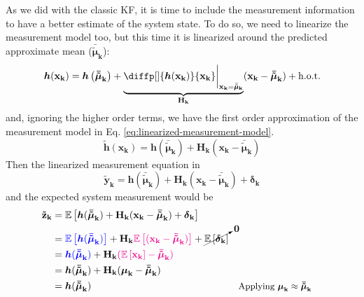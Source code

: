 \documentclass[12pt]{article}
\newcommand{\bvec}[1]{\mathbf{#1}} %
\newcommand{\mat}[1]{\mathbf{#1}}
\newcommand{\brac}[1]{\left[#1\right]} %
\newcommand{\parentheses}[1]{\left(#1\right)}
\newcommand{\mb}[1]{{\boldsymbol{#1}}} %
\newcommand{\expv}[1]{\mathbb{E}\brac{#1}} %
\newcommand{\hot}{\text{h.o.t.}}
\newcommand{\blue}[1]{\color{blue}#1\color{black}}
\newcommand{\magenta}[1]{\color{magenta}#1\color{black}}
\begin{document}
As we did with the classic KF, it is time to include the measurement information to have a better estimate of the system state. To do so, we need to linearize the measurement model too, but this time it is linearized around the predicted approximate mean ($\mb{\bar{\tilde{\mu}}}_\mathbf{k}$):
\begin{equation*}
    \mb{h}(\bvec{x_k}) = \mb{h}\parentheses{\mb{\bar{\tilde{\mu}}}_\mathbf{k}} + \underbrace{\diffp[]{\mb{h}(\bvec{x_k})}{\bvec{x_{k}}} \bigg\lvert_{\bvec{x_k}=\bar{\mb{\tilde{\mu}}}_\mathbf{k}}}_{\mat{H_k}} (\bvec{x_k} - \mb{\bar{\tilde{\mu}}}_\mathbf{k}) + \hot
\end{equation*}
and, ignoring the higher order terms, we have the first order approximation of the measurement model in Eq. \ref{eq:linearized-measurement-model}.
\begin{equation}
    \mb{\tilde{h}}(\bvec{x_k}) = \mb{h}(\mb{\bar{\tilde\mu}}_\mathbf{k}) + \mat{H_k} (\bvec{x_k} - \mb{\bar{\tilde\mu}}_\mathbf{k})
    \label{eq:linearized-measurement-model} 
\end{equation}
Then the linearized measurement equation in
\begin{equation}
    \bvec{\tilde{y}_k} = \mb{h}(\mb{\bar{\tilde\mu}}_\mathbf{k}) + \mat{H_k}(\bvec{x_k} - \mb{\bar{\tilde{\mu}}}_\mathbf{k}) + \mb{\delta}_\mathbf{k}
\end{equation}
and the expected system measurement would be
\begin{equation}
\begin{aligned}
    \bvec{\tilde{z}_k} &= \expv{\mb{h}(\mb{\bar{\tilde\mu}}_\mathbf{k}) + \mat{H_k}(\bvec{x_k} - \mb{\bar{\tilde{\mu}}}_\mathbf{k}) + \mb{\delta}_\mathbf{k}}\\
    &= \blue{\expv{\mb{h}(\mb{\bar{\tilde\mu}}_\mathbf{k})}} + \mat{H_k}\magenta{\expv{(\bvec{x_k} - \mb{\bar{\tilde{\mu}}}_\mathbf{k})}} + \cancelto{\mat{0}}{\expv{\mb{\delta}_\mathbf{k}}}\\
    &= \blue{\mb{h}(\mb{\bar{\tilde\mu}}_\mathbf{k})} + \mat{H_k}\magenta{(\expv{\bvec{x_k}} - \mb{\bar{\tilde{\mu}}}_\mathbf{k})}\\
    &= \mb{h}(\mb{\bar{\tilde\mu}}_\mathbf{k}) + \mat{H_k}(\mb{\mu}_\mathbf{k} - \mb{\bar{\tilde{\mu}}}_\mathbf{k})\\
    &= \mb{h}(\mb{\bar{\tilde\mu}}_\mathbf{k}) && \small\text{Applying $\mb{\mu}_\mathbf{k} \approx \mb{\bar{\tilde{\mu}}}_\mathbf{k}$}
\end{aligned}
\end{equation}
\end{document}
